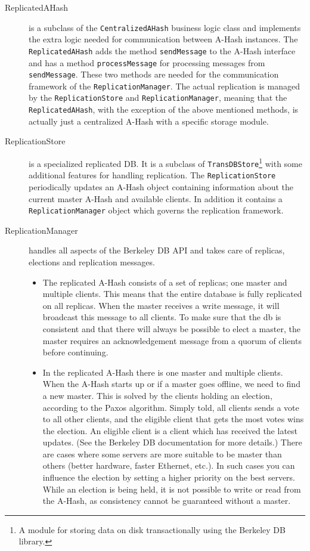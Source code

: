 \documentclass{book}
\begin{document}
\begin{description}
    \item[ReplicatedAHash] 
	is a subclass of the \verb!CentralizedAHash! business logic class and implements the extra logic needed for communication between A-Hash instances. The \verb!ReplicatedAHash! adds the method \verb!sendMessage! to the A-Hash interface and has a method \verb!processMessage! for processing messages from \verb!sendMessage!. These two methods are needed for the communication framework of the \verb!ReplicationManager!. The actual replication is managed by the \verb!ReplicationStore! and \verb!ReplicationManager!, meaning that the \verb!ReplicatedAHash!, with the exception of the above mentioned methods, is actually just a centralized A-Hash with a specific storage module.
    \item[ReplicationStore] 
	is a specialized replicated DB. It is a subclass of \verb!TransDBStore!\footnote{A module for storing data on disk transactionally using the Berkeley DB library.} with some additional features for handling replication. The \verb!ReplicationStore! periodically updates an A-Hash object containing information about the current master A-Hash and available clients. In addition it contains a \verb!ReplicationManager! object which governs the replication framework.
    \item[ReplicationManager] 
	handles all aspects of the Berkeley DB API and takes care of replicas, elections and replication messages.
	\begin{itemize}
	\item The replicated A-Hash consists of a set of replicas; one master and multiple clients. This means that the entire database is fully replicated on all replicas. When the master receives a write message, it will broadcast this message to all clients. To make sure that the db is consistent and that there will always be possible to elect a master, the master requires an acknowledgement message from a quorum of clients before continuing.
	\item In the replicated A-Hash there is one master and multiple clients. When the A-Hash starts up or if a master goes offline, we need to find a new master. This is solved by the clients holding an election, according to the Paxos algorithm. Simply told, all clients sends a vote to all other clients, and the eligible client that gets the most votes wins the election. An eligible client is a client which has received the latest updates. (See the Berkeley DB documentation for more details.) There are cases where some servers are more suitable to be master than others (better hardware, faster Ethernet, etc.). In such cases you can influence the election by setting a higher priority on the best servers. While an election is being held, it is not possible to write or read from the A-Hash, as consistency cannot be guaranteed without a master.

\end{itemize}
\end{description}
\end{document}
